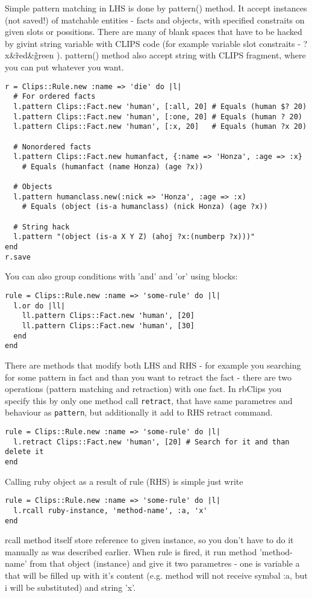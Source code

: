 \documentclass[a4paper,10pt]{article}
\begin{document}
Simple pattern matching in LHS is done by pattern() method. It accept instances (not saved!) of matchable entities - facts and objects, with specified constraits on given slots or possitions. There are many of blank spaces that have to be hacked by givint string variable with CLIPS code (for example variable slot constraits - ?x\&\~red\&\~green ). pattern() method also accept string with CLIPS fragment, where you can put whatever you want. 

\begin{verbatim}
r = Clips::Rule.new :name => 'die' do |l|
  # For ordered facts
  l.pattern Clips::Fact.new 'human', [:all, 20] # Equals (human $? 20)
  l.pattern Clips::Fact.new 'human', [:one, 20] # Equals (human ? 20)
  l.pattern Clips::Fact.new 'human', [:x, 20]   # Equals (human ?x 20)
  
  # Nonordered facts
  l.pattern Clips::Fact.new humanfact, {:name => 'Honza', :age => :x} 
    # Equals (humanfact (name Honza) (age ?x))

  # Objects
  l.pattern humanclass.new(:nick => 'Honza', :age => :x)
    # Equals (object (is-a humanclass) (nick Honza) (age ?x))
	
  # String hack
  l.pattern "(object (is-a X Y Z) (ahoj ?x:(numberp ?x)))"
end
r.save
\end{verbatim}

You can also group conditions with 'and' and 'or' using blocks:
\begin{verbatim}
rule = Clips::Rule.new :name => 'some-rule' do |l|
  l.or do |ll|
    ll.pattern Clips::Fact.new 'human', [20]
    ll.pattern Clips::Fact.new 'human', [30]
  end
end
\end{verbatim}

There are methods that modify both LHS and RHS - for example you searching for some pattern in fact and than you want to retract the fact - there are two operations (pattern matching and retraction) with one fact. In rbClips you specify this by only one method call \texttt{retract}, that have same parametres and behaviour as \texttt{pattern}, but additionally it add to RHS retract command.
\begin{verbatim}
rule = Clips::Rule.new :name => 'some-rule' do |l|
  l.retract Clips::Fact.new 'human', [20] # Search for it and than delete it
end
\end{verbatim}

Calling ruby object as a result of rule (RHS) is simple just write
\begin{verbatim}
rule = Clips::Rule.new :name => 'some-rule' do |l|
  l.rcall ruby-instance, 'method-name', :a, 'x'
end
\end{verbatim}
rcall method itself store reference to given instance, so you don't have to do it manually as was described earlier. When rule is fired, it run method 'method-name' from that object (instance) and give it two parametres - one is variable a that will be filled up with it's content (e.g. method will not receive symbal :a, but i will be substituted) and string 'x'.
\end{document}
